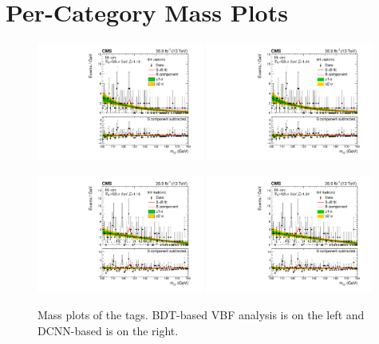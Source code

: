 
\chapter{Per-Category Mass Plots}
\label{appendix:mass_plots}
\begin{figure}[h!]
    \begin{center}
        \includegraphics[width=0.49\textwidth]{figures/appendix_mass_plots/CMS-HIG-16-040_Figure_012-d.pdf}
        \includegraphics[width=0.49\textwidth]{figures/appendix_mass_plots/SBplots_jackWSnewOldTTHTTHLeptonicTag_13TeV.pdf}
    \end{center}
    \begin{center}
        \includegraphics[width=0.49\textwidth]{figures/appendix_mass_plots/CMS-HIG-16-040_Figure_012-e.pdf}
        \includegraphics[width=0.49\textwidth]{figures/appendix_mass_plots/SBplots_jackWSnewOldTTHTTHHadronicTag_13TeV.pdf}
    \end{center}
    \label{fig:app_mass_plots:tth}
    \caption{Mass plots of the \ttH tags. BDT-based VBF analysis is on the left and DCNN-based is on the right.}
\end{figure}


